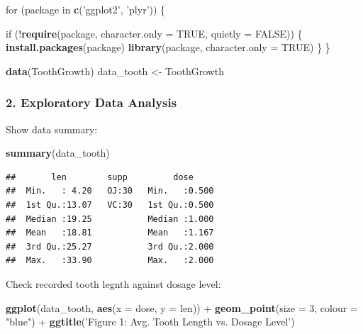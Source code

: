 \documentclass[]{article}
\newenvironment{Shaded}{\begin{snugshade}}{\end{snugshade}}
\newcommand{\KeywordTok}[1]{\textcolor[rgb]{0.13,0.29,0.53}{\textbf{{#1}}}}
\newcommand{\DataTypeTok}[1]{\textcolor[rgb]{0.13,0.29,0.53}{{#1}}}
\newcommand{\DecValTok}[1]{\textcolor[rgb]{0.00,0.00,0.81}{{#1}}}
\newcommand{\StringTok}[1]{\textcolor[rgb]{0.31,0.60,0.02}{{#1}}}
\newcommand{\OtherTok}[1]{\textcolor[rgb]{0.56,0.35,0.01}{{#1}}}
\newcommand{\NormalTok}[1]{{#1}}
\begin{document}
\begin{Shaded}
\begin{Highlighting}[]
\NormalTok{for (package in }\KeywordTok{c}\NormalTok{(}\StringTok{'ggplot2'}\NormalTok{, }\StringTok{'plyr'}\NormalTok{)) \{}
 
    \NormalTok{if (!}\KeywordTok{require}\NormalTok{(package, }\DataTypeTok{character.only =} \OtherTok{TRUE}\NormalTok{, }\DataTypeTok{quietly =} \OtherTok{FALSE}\NormalTok{)) \{}
        \KeywordTok{install.packages}\NormalTok{(package)}
        \KeywordTok{library}\NormalTok{(package, }\DataTypeTok{character.only =} \OtherTok{TRUE}\NormalTok{)}
    \NormalTok{\}}
\NormalTok{\}}

\KeywordTok{data}\NormalTok{(ToothGrowth)}
\NormalTok{data_tooth <-}\StringTok{ }\NormalTok{ToothGrowth}
\end{Highlighting}
\end{Shaded}

\subsubsection{2. Exploratory Data
Analysis}\label{exploratory-data-analysis}

Show data summary:

\begin{Shaded}
\begin{Highlighting}[]
\KeywordTok{summary}\NormalTok{(data_tooth)}
\end{Highlighting}
\end{Shaded}

\begin{verbatim}
##       len        supp         dose      
##  Min.   : 4.20   OJ:30   Min.   :0.500  
##  1st Qu.:13.07   VC:30   1st Qu.:0.500  
##  Median :19.25           Median :1.000  
##  Mean   :18.81           Mean   :1.167  
##  3rd Qu.:25.27           3rd Qu.:2.000  
##  Max.   :33.90           Max.   :2.000
\end{verbatim}

Check recorded tooth legnth against dosage level:

\begin{Shaded}
\begin{Highlighting}[]
\KeywordTok{ggplot}\NormalTok{(data_tooth, }\KeywordTok{aes}\NormalTok{(}\DataTypeTok{x =} \NormalTok{dose, }\DataTypeTok{y =} \NormalTok{len)) +}\StringTok{ }
\StringTok{  }\KeywordTok{geom_point}\NormalTok{(}\DataTypeTok{size =} \DecValTok{3}\NormalTok{, }\DataTypeTok{colour =} \StringTok{"blue"}\NormalTok{) +}
\StringTok{  }\KeywordTok{ggtitle}\NormalTok{(}\StringTok{'Figure 1: Avg. Tooth Length vs. Dosage Level'}\NormalTok{)}
\end{Highlighting}
\end{Shaded}
\end{document}
